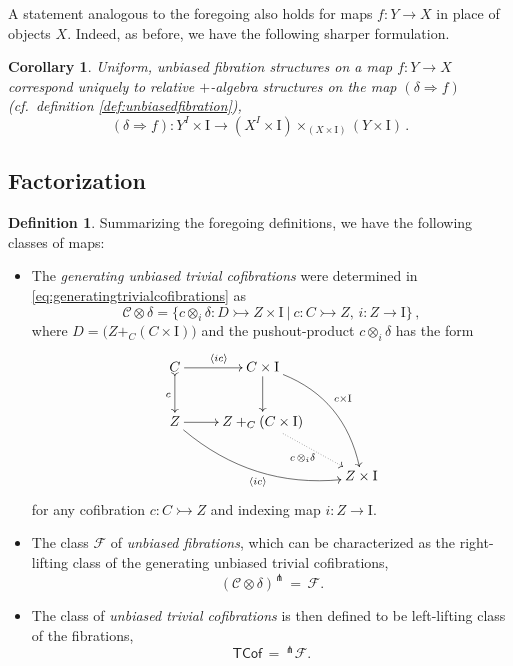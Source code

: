 \documentclass[11pt,reqno]{amsart}
\newcommand{\mono}{\ensuremath{\rightarrowtail}}
\newcommand{\ra}{\ensuremath{\rightarrow}}
\newcommand{\too}{\ensuremath{\longrightarrow}}
\newcommand{\gph}[1]{\ensuremath{\langle #1 \rangle}}
\newcommand{\I}{\ensuremath{\mathrm{I}}}
\newtheorem{corollary}[theorem]{Corollary}
\theoremstyle{remark}
\theoremstyle{definition}
\newtheorem{definition}[theorem]{Definition}
\begin{document}
A statement analogous to the foregoing also holds for maps $f:Y\ra X$ in place of objects $X$.  Indeed, as before, we have the following sharper formulation.

\begin{corollary}
Uniform, unbiased fibration structures on a map $f : Y\ra X$ correspond uniquely to relative $+$-algebra structures on the map $(\delta\Rightarrow{f})$ (cf.\ definition \ref{def:unbiasedfibration}),
\[
(\delta\Rightarrow{f}) : Y^I\times \I \too (X^I \times \I)\times_{(X\times \I)} (Y\times\I)\,.
\]
\end{corollary}

\subsection*{Factorization}\label{subsec:FWFS}

\begin{definition}\label{def:FibWFSclasses}
Summarizing the foregoing definitions, we have the following classes of maps:

\begin{itemize}
\item  The \emph{generating unbiased trivial cofibrations} were determined in \eqref{eq:generatingtrivialcofibrations} as
\begin{equation}\label{eq:genunbiasedTCof}
\mathcal{C}\otimes\delta = \{c \otimes_i \delta : D \mono Z\times\I\ |\  c : C\mono Z,\, i : Z \ra \I\}\,,
\end{equation}
where $D = \big(Z +_C (C\times\I)\big)$ and the pushout-product $c\otimes_i \delta$ has the form
\begin{equation}\label{diagram:unbiasedbasicpushoutproduct2}
\xymatrix{
C \ar@{>->}[d]_{c} \ar[r]^{\gph{ic}} & C\times \I \ar[d] \ar@/^4ex/ [rdd]^{c\times\I}\\
Z \ar@/_4ex/ [rrd]_{\gph{ic}} \ar[r] &  Z +_C (C\times\I) \ar@{.>}[rd]_{c\, \otimes_i \delta} \\
&& Z\times\I
}
\end{equation}
for any cofibration $c : C\mono Z$ and indexing map $i: Z \ra \I$.

\item The class $\mathcal{F}$ of \emph{unbiased fibrations}, which can be characterized as the right-lifting class of the generating unbiased trivial cofibrations,
\[
(\mathcal{C}\otimes\delta)^\pitchfork\, =\,\mathcal{F}.
\]

\item The class of \emph{unbiased trivial cofibrations} is then defined to be left-lifting class of the fibrations,
\[
\mathsf{TCof}\, =\, ^{\pitchfork}\mathcal{F}.
\]
\end{itemize}
\end{definition}
\end{document}
